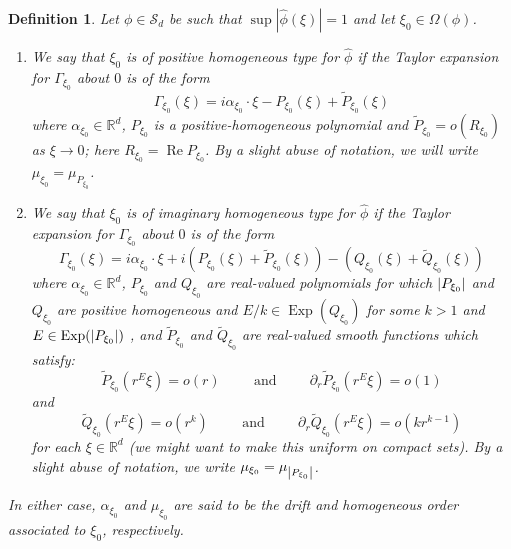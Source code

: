 \documentclass[11pt]{article}
\newtheorem{definition}[theorem]{Definition}
\renewcommand\Re{\operatorname{Re}}%
\newcommand\Exp{\operatorname{Exp}}
\begin{document}
\begin{definition}\label{def:Types}
Let $\phi\in\mathcal{S}_d$ be such that $\sup|\hat\phi(\xi)|=1$ and let $\xi_0\in\Omega(\phi)$. 
\begin{enumerate}
    \item We say that $\xi_0$ is of positive homogeneous type for $\widehat\phi$ if the Taylor expansion for $\Gamma_{\xi_0}$ about $0$ is of the form
\begin{equation}\label{eq:PosHomType}
    \Gamma_{\xi_0}(\xi)=i\alpha_{\xi_0}\cdot\xi-P_{\xi_0}(\xi)+\widetilde{P}_{\xi_0}(\xi)
\end{equation}
where $\alpha_{\xi_0}\in\mathbb{R}^d$, $P_{\xi_0}$ is a positive-homogeneous polynomial and $\widetilde{P}_{\xi_0}=o(R_{\xi_0})$ as $\xi\rightarrow 0$; here $R_{\xi_0}=\Re P_{\xi_0}$. By a slight abuse of notation, we will write $\mu_{\xi_0}=\mu_{P_{\xi_0}}$.
    \item We say that $\xi_0$ is of imaginary homogeneous type for $\widehat{\phi}$ if the Taylor expansion for $\Gamma_{\xi_0}$ about $0$ is of the form
\begin{equation*}
    \Gamma_{\xi_0}(\xi)=i\alpha_{\xi_0}\cdot\xi +i\left(P_{\xi_0}(\xi)+\widetilde{P}_{\xi_0}(\xi)\right)-\left(Q_{\xi_0}(\xi)+\widetilde{Q}_{\xi_0}(\xi)\right)
\end{equation*}
where $\alpha_{\xi_0}\in\mathbb{R}^d$, $P_{\xi_0}$ and $Q_{\xi_0}$ are real-valued polynomials for which $\abs{P_{\xi_0}}$ and $Q_{\xi_0}$ are positive homogeneous and $E/k\in\Exp(Q_{\xi_0})$ for some $k>1$ and $E\in\Exp(\abs{P_{\xi_0}})$ , and $\widetilde{P}_{\xi_0}$ and $\widetilde{Q}_{\xi_0}$ are real-valued smooth functions which satisfy:
\begin{equation*}
    \widetilde{P}_{\xi_0}(r^E\xi)=o(r)\hspace{1cm}\mbox{and}\hspace{1cm}\partial_r\widetilde{P}_{\xi_0}(r^E\xi)=o(1)
\end{equation*}
and
\begin{equation*}
    \widetilde{Q}_{\xi_0}(r^E\xi)=o(r^{k})\hspace{1cm}\mbox{and}\hspace{1cm}\partial_r\widetilde{Q}_{\xi_0}(r^E\xi)=o(kr^{k-1})
\end{equation*}
for each $\xi\in\mathbb{R}^d$ (we might want to make this uniform on compact sets). By a slight abuse of notation, we write $\mu_{\xi_0}=\mu_{\abs{P_{\xi_0}}}$.
\end{enumerate}
In either case, $\alpha_{\xi_0}$ and $\mu_{\xi_0}$ are said to be the drift and homogeneous order associated to $\xi_0$, respectively.
\end{definition}
\end{document}

